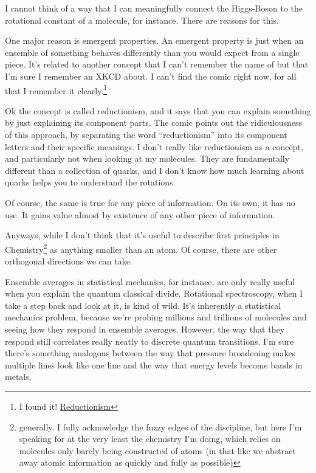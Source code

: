 \documentclass[12pt]{article}[titlepage]
\newcommand{\say}[1]{``#1''}
\newcommand{\1}{\={a}}
\newcommand{\2}{\={e}}
\newcommand{\3}{\={\i}}
\newcommand{\4}{\=o}
\newcommand{\5}{\=u}
\newcommand{\6}{\={A}}
\renewcommand{\,}{\textsuperscript{,}}
\begin{document}
I cannot think of a way that I can meaningfully connect the Higgs-Boson to the rotational constant of a molecule, for instance.
There are reasons for this.

One major reason is emergent properties.
An emergent property is just when an ensemble of something behaves differently than you would expect from a single piece.
It's related to another concept that I can't remember the name of but that I'm sure I remember an XKCD about.
I can't find the comic right now, for all that I remember it clearly.\footnote{I found it! \href{https://www.explainxkcd.com/wiki/index.php/1734:_Reductionism}{Reductionism}}

Ok the concept is called reductionism, and it says that you can explain something by just explaining its component parts.
The comic points out the ridiculousness of this approach, by separating the word \say{reductionism} into its component letters and their specific meanings.
I don't really like reductionism as a concept, and particularly not when looking at my molecules.
They are fundamentally different than a collection of quarks, and I don't know how much learning about quarks helps you to understand the rotations.

Of course, the same is true for any piece of information.
On its own, it has no use.
It gains value almost by existence of any other piece of information.

Anyways, while I don't think that it's useful to describe first principles in Chemistry\footnote{generally.
I fully acknowledge the fuzzy edges of the discipline, but here I'm speaking for at the very least the chemistry I'm doing, which relies on molecules only barely being constructed of atoms (in that like we abstract away atomic information as quickly and fully as possible)} as anything smaller than an atom.
Of course, there are other orthogonal directions we can take.

Ensemble averages in statistical mechanics, for instance, are only really useful when you explain the quantum classical divide.
Rotational spectroscopy, when I take a step back and look at it, is kind of wild.
It's inherently a statistical mechanics problem, because we're probing millions and trillions of molecules and seeing how they respond in ensemble averages.
However, the way that they respond still correlates really neatly to discrete quantum transitions.
I'm sure there's something analogous between the way that pressure broadening makes multiple lines look like one line and the way that energy levels become bands in metals.
\end{document}
